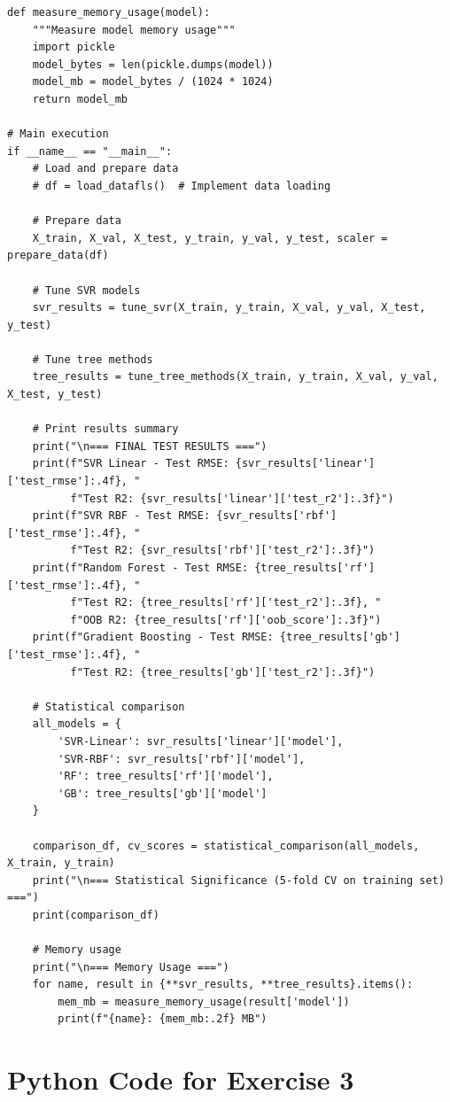 \documentclass[12pt,a4paper]{article}
\theoremstyle{definition}
\begin{document}
\begin{lstlisting}[caption={Data Preparation and SVR Implementation with Proper Metrics}]
def measure_memory_usage(model):
    """Measure model memory usage"""
    import pickle
    model_bytes = len(pickle.dumps(model))
    model_mb = model_bytes / (1024 * 1024)
    return model_mb

# Main execution
if __name__ == "__main__":
    # Load and prepare data
    # df = load_datafls()  # Implement data loading
    
    # Prepare data
    X_train, X_val, X_test, y_train, y_val, y_test, scaler = prepare_data(df)
    
    # Tune SVR models
    svr_results = tune_svr(X_train, y_train, X_val, y_val, X_test, y_test)
    
    # Tune tree methods
    tree_results = tune_tree_methods(X_train, y_train, X_val, y_val, X_test, y_test)
    
    # Print results summary
    print("\n=== FINAL TEST RESULTS ===")
    print(f"SVR Linear - Test RMSE: {svr_results['linear']['test_rmse']:.4f}, "
          f"Test R2: {svr_results['linear']['test_r2']:.3f}")
    print(f"SVR RBF - Test RMSE: {svr_results['rbf']['test_rmse']:.4f}, "
          f"Test R2: {svr_results['rbf']['test_r2']:.3f}")
    print(f"Random Forest - Test RMSE: {tree_results['rf']['test_rmse']:.4f}, "
          f"Test R2: {tree_results['rf']['test_r2']:.3f}, "
          f"OOB R2: {tree_results['rf']['oob_score']:.3f}")
    print(f"Gradient Boosting - Test RMSE: {tree_results['gb']['test_rmse']:.4f}, "
          f"Test R2: {tree_results['gb']['test_r2']:.3f}")
    
    # Statistical comparison
    all_models = {
        'SVR-Linear': svr_results['linear']['model'],
        'SVR-RBF': svr_results['rbf']['model'],
        'RF': tree_results['rf']['model'],
        'GB': tree_results['gb']['model']
    }
    
    comparison_df, cv_scores = statistical_comparison(all_models, X_train, y_train)
    print("\n=== Statistical Significance (5-fold CV on training set) ===")
    print(comparison_df)
    
    # Memory usage
    print("\n=== Memory Usage ===")
    for name, result in {**svr_results, **tree_results}.items():
        mem_mb = measure_memory_usage(result['model'])
        print(f"{name}: {mem_mb:.2f} MB")
\end{lstlisting}

\section{Python Code for Exercise 3}
\end{document}
